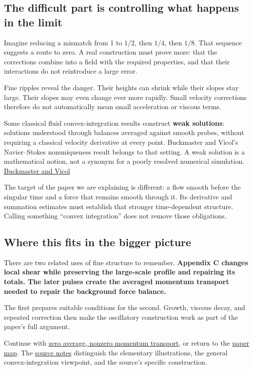 \documentclass[
  english,
  11pt,
]{article}
\begin{document}
\subsection{The difficult part is controlling what happens in the
limit}\label{the-difficult-part-is-controlling-what-happens-in-the-limit}

Imagine reducing a mismatch from 1 to \(1/2\), then \(1/4\), then
\(1/8\). That sequence suggests a route to zero. A real construction
must prove more: that the corrections combine into a field with the
required properties, and that their interactions do not reintroduce a
large error.

Fine ripples reveal the danger. Their heights can shrink while their
slopes stay large. Their slopes may even change ever more rapidly. Small
velocity corrections therefore do not automatically mean small
acceleration or viscous terms.

Some classical fluid convex-integration results construct \textbf{weak
solutions}: solutions understood through balances averaged against
smooth probes, without requiring a classical velocity derivative at
every point. Buckmaster and Vicol's Navier--Stokes nonuniqueness result
belongs to that setting. A weak solution is a mathematical notion, not a
synonym for a poorly resolved numerical simulation.
\href{https://arxiv.org/abs/1709.10033}{Buckmaster and Vicol}

The target of the paper we are explaining is different: a flow smooth
before the singular time and a force that remains smooth through it. Its
derivative and summation estimates must establish that stronger
time-dependent structure. Calling something ``convex integration'' does
not remove those obligations.

\subsection{Where this fits in the bigger
picture}\label{where-this-fits-in-the-bigger-picture}

There are two related uses of fine structure to remember.
\textbf{Appendix C changes local shear while preserving the large-scale
profile and repairing its totals. The later pulses create the averaged
momentum transport needed to repair the background force balance.}

The first prepares suitable conditions for the second. Growth, viscous
decay, and repeated correction then make the oscillatory construction
work as part of the paper's full argument.

Continue with \href{../d4_mean_stress/article.html}{zero average,
nonzero momentum transport}, or return to the
\href{../paper-map/article.html}{paper map}. The
\href{source-notes.md}{source notes} distinguish the elementary
illustrations, the general convex-integration viewpoint, and the
source's specific construction.
\end{document}
